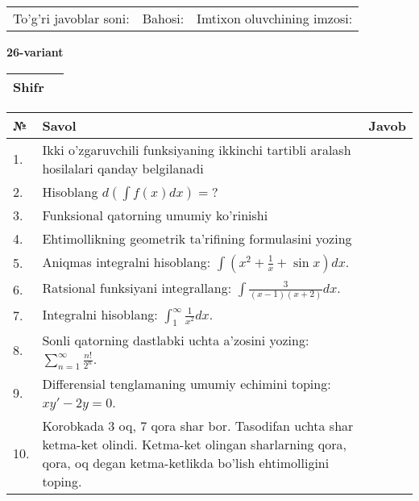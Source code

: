 \documentclass{article}
\begin{document}
  \vspace{1cm}
  
  \begin{tabular}{lll}
  To'g'ri javoblar soni: \underline{\hspace{1.5cm}} & 
  Bahosi: \underline{\hspace{1.5cm}} & 
  Imtixon oluvchining imzosi: \underline{\hspace{2cm}} \\
  \end{tabular}
  
  \egroup
  
  \newpage
  
  
  \textbf{26-variant}\\
  
  \bgroup
  \def\arraystretch{1.6} %
  
  \begin{tabular}{|m{5.7cm}|m{9.5cm}|}
  \hline
  Shifr & \\
  \hline
  \end{tabular}
  
  \vspace{1cm}
  
  \begin{tabular}{|m{0.7cm}|m{10cm}|m{4cm}|}
  \hline
  № & Savol & Javob \\
  \hline
  1. & Ikki o'zgaruvchili funksiyaning ikkinchi tartibli aralash hosilalari qanday belgilanadi &  \\
  \hline
  2. & Hisoblang \(d\left( \int {f(x)dx} \right) = ?\) &  \\
  \hline
  3. & Funksional qatorning umumiy ko'rinishi &  \\
  \hline
  4. & Ehtimollikning geometrik ta'rifining formulasini yozing &  \\
  \hline
  5. & Aniqmas integralni hisoblang: \(\int {\left( x^{2} + \frac{1}{x} + \sin x \right)dx}\). &  \\
  \hline
  6. & Ratsional funksiyani integrallang: \(\int {\frac{3}{(x - 1)(x + 2)}dx}\). &  \\
  \hline
  7. & Integralni hisoblang: \(\int_{1}^{\infty}{\frac{1}{x^{2}}dx}\). &  \\
  \hline
  8. & Sonli qatorning dastlabki uchta a'zosini yozing: \(\sum_{n = 1}^{\infty}\frac{n!}{2^{n}}\). &  \\
  \hline
  9. & Differensial tenglamaning umumiy echimini toping: \(xy' - 2y = 0\). &  \\
  \hline
  10. & Korobkada 3 oq, 7 qora shar bor. Tasodifan uchta shar ketma-ket olindi. Ketma-ket olingan sharlarning qora, qora, oq degan ketma-ketlikda bo'lish ehtimolligini toping. &  \\
  \hline
  \end{tabular}
  
\end{document}

